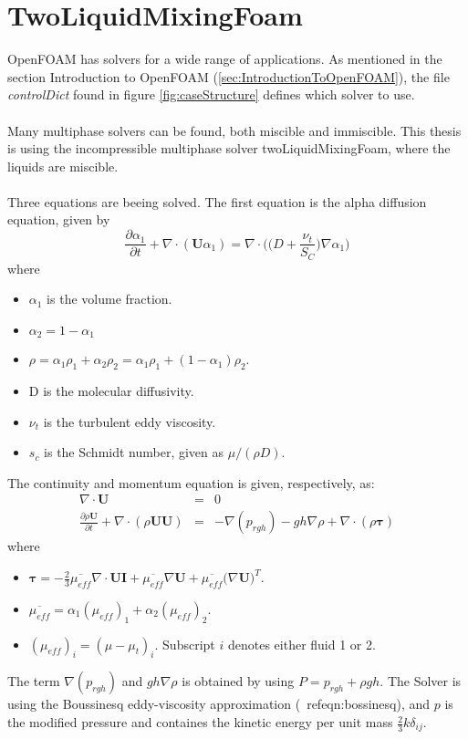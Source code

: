 \documentclass[a4paper, 12pt]{report}
\begin{document}
\section{TwoLiquidMixingFoam}
\label{sec:TwoLiquidMixingFoam}
OpenFOAM has solvers for a wide range of applications. As mentioned in the section Introduction to OpenFOAM (\ref{sec:IntroductionToOpenFOAM}), the file \textit{controlDict} found in figure \ref{fig:caseStructure} defines which solver to use.\\
\\
Many multiphase solvers can be found, both miscible and immiscible. This thesis is using the incompressible multiphase solver twoLiquidMixingFoam, where the liquids are miscible.\\
\\
Three equations are beeing solved. The first equation is the alpha diffusion equation, given by \cite{Krpan}
\begin{equation}
\frac{\partial \alpha_1}{\partial t} + \nabla \cdot (\mathbf{U} \alpha_1) = \nabla \cdot \Big(\big(D + \frac{\nu_t}{S_C}  \big)\nabla \alpha_1 \Big) 
\label{eqn:alphaEqTLMF}
\end{equation}
where
\begin{itemize}
	\item $\alpha_1$ is the volume fraction.
	\item $\alpha_2 = 1 - \alpha_1$	
	\item $\rho = \alpha_1 \rho_1 + \alpha_2 \rho_2 = \alpha_1\rho_1 + (1 - \alpha_1)\rho_2$.
	\item D is the molecular diffusivity.
	\item $\nu_t$ is the turbulent eddy viscosity.
	\item $s_c$ is the Schmidt number, given as $\mu / (\rho D)$.
\end{itemize}
The continuity and momentum equation is given, respectively, as: 
\begin{eqnarray}
\label{eqn:continuityTLMF}
\nabla \cdot \mathbf{U} &=& 0 \\
\label{eqn:momentumTLMF}
\frac{\partial \rho \mathbf{U}}{\partial t} + \nabla \cdot(\rho \mathbf{U} \mathbf{U}) &=& - \nabla (p_{rgh}) - gh\nabla \rho + \nabla \cdot (\rho \boldsymbol{\tau})
\end{eqnarray}
where 
\begin{itemize}
	\item $\boldsymbol{\tau} = -\frac{2}{3}\overline{\mu_{eff}}\nabla \cdot \mathbf{U} \mathbf{I} + \overline{\mu_{eff}}\nabla \mathbf{U} + \overline{\mu_{eff}}\big(\nabla \mathbf{U}\big)^T$.
	\item $\overline{\mu_{eff}} = \alpha_1 (\mu_{eff})_1 + \alpha_2 (\mu_{eff})_2$.
	\item $(\mu_{eff})_i = (\mu - \mu_t)_i$. Subscript $i$ denotes either fluid 1 or 2.
\end{itemize}
The term $\nabla(p_{rgh})$ and $gh \nabla \rho$ is obtained by using $P = p_{rgh} + \rho gh$. The Solver is using the Boussinesq eddy-viscosity approximation (\
ref{eqn:bossinesq}), and $p$ is the modified pressure and containes the kinetic energy per unit mass $\frac{2}{3}k\delta_{ij}$.
\end{document}
